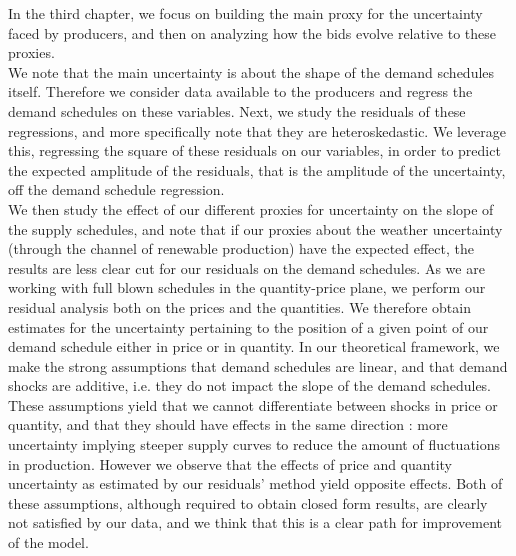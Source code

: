 In the third chapter, we focus on building the main proxy for the uncertainty faced by producers, and then on analyzing how the bids evolve relative to these proxies.\\

We note that the main uncertainty is about the shape of the demand schedules itself. Therefore we consider data available to the producers and regress the demand schedules on these variables. Next, we study the residuals of these regressions, and more specifically note that they are heteroskedastic. We leverage this, regressing the square of these residuals on our variables, in order to predict the expected amplitude of the residuals, that is the amplitude of the uncertainty, off the demand schedule regression.\\

We then study the effect of our different proxies for uncertainty on the slope of the supply schedules, and note that if our proxies about the weather uncertainty (through the channel of renewable production) have the expected effect, the results are less clear cut for our residuals on the demand schedules. As we are working with full blown schedules in the quantity-price plane, we perform our residual analysis both on the prices and the quantities. We therefore obtain estimates for the uncertainty pertaining to the position of a given point of our demand schedule either in price or in quantity. In our theoretical framework, we make the strong assumptions that demand schedules are linear, and that demand shocks are additive, i.e. they do not impact the slope of the demand schedules. These assumptions yield that we cannot differentiate between shocks in price or quantity, and that they should have effects in the same direction : more uncertainty implying steeper supply curves to reduce the amount of fluctuations in production. However we observe that the effects of price and quantity uncertainty as estimated by our residuals' method yield opposite effects. Both of these assumptions, although required to obtain closed form results, are clearly not satisfied by our data, and we think that this is a clear path for improvement of the model.  





 